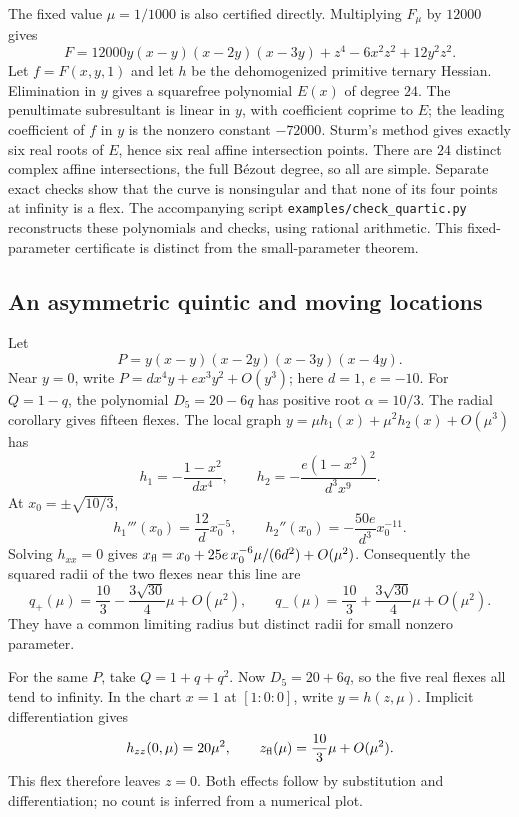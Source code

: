 \documentclass[11pt,a4paper]{article}
\theoremstyle{remark}
\begin{document}
The fixed value \(\mu=1/1000\) is also certified directly.
Multiplying \(F_\mu\) by \(12000\) gives
\[
 F=12000y(x-y)(x-2y)(x-3y)+z^4-6x^2z^2+12y^2z^2.
\]
Let \(f=F(x,y,1)\) and let \(h\) be the dehomogenized
primitive ternary Hessian. Elimination in \(y\) gives a
squarefree polynomial \(E(x)\) of degree \(24\). The
penultimate subresultant is linear in \(y\), with coefficient
coprime to \(E\); the leading coefficient of \(f\) in \(y\)
is the nonzero constant \(-72000\). Sturm's method gives
exactly six real roots of \(E\), hence six real affine
intersection points. There are \(24\) distinct complex
affine intersections, the full B\'ezout degree, so all are
simple. Separate exact checks show that the curve is
nonsingular and that none of its four points at infinity
is a flex. The accompanying script
\texttt{examples/check\_quartic.py} reconstructs these
polynomials and checks, using rational arithmetic.
This fixed-parameter certificate is distinct from the
small-parameter theorem.

\subsection{An asymmetric quintic and moving locations}\label{sec:asymmetric}

Let
\[
                   P=y(x-y)(x-2y)(x-3y)(x-4y).
\]
Near \(y=0\), write \(P=d x^4y+e x^3y^2+O(y^3)\);
here \(d=1\), \(e=-10\). For \(Q=1-q\), the polynomial
\(D_5=20-6q\) has positive root \(\alpha=10/3\).
The radial corollary gives fifteen flexes. The local graph
\(y=\mu h_1(x)+\mu^2h_2(x)+O(\mu^3)\) has
\[
 h_1=-\frac{1-x^2}{d x^4},\qquad
 h_2=-\frac{e(1-x^2)^2}{d^3x^9}.
\]
At \(x_0=\pm\sqrt{10/3}\),
\[
 h_1'''(x_0)=\frac{12}{d}x_0^{-5},\qquad
 h_2''(x_0)=-\frac{50e}{d^3}x_0^{-11}.
\]
Solving \(h_{xx}=0\) gives
\(x_{\rm fl}=x_0+25e\,x_0^{-6}\mu/(6d^2)+O(\mu^2)\).
Consequently the squared radii of the two flexes near this line are
\begin{equation}\label{eq:split}
 q_+(\mu)=\frac{10}{3}-\frac{3\sqrt{30}}4\mu+O(\mu^2),
 \qquad
 q_-(\mu)=\frac{10}{3}+\frac{3\sqrt{30}}4\mu+O(\mu^2).
\end{equation}
They have a common limiting radius but distinct radii for
small nonzero parameter.

For the same \(P\), take \(Q=1+q+q^2\). Now \(D_5=20+6q\),
so the five real flexes all tend to infinity. In the chart
\(x=1\) at \([1:0:0]\), write \(y=h(z,\mu)\).
Implicit differentiation gives
\[
                  h_{zz}(0,\mu)=20\mu^2,\qquad
                  z_{\rm fl}(\mu)=\frac{10}{3}\mu+O(\mu^2).
\]
This flex therefore leaves \(z=0\).
Both effects follow by substitution and differentiation;
no count is inferred from a numerical plot.
\end{document}

